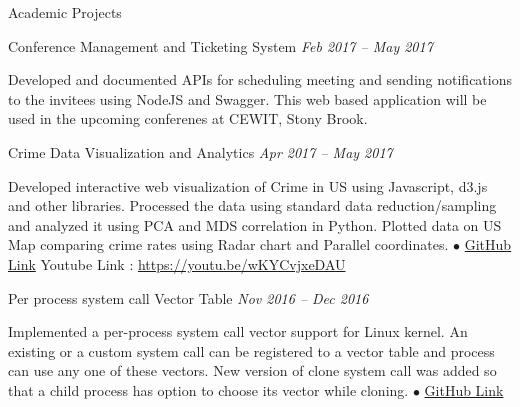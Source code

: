 \documentclass{resume} %
\begin{document}
\begin{rSection}{Academic Projects}


\begin{rSubsection}{Conference Management and Ticketing System} {\emph {Feb 2017 -- May 2017}}{}{}
	\item Developed and documented APIs for scheduling meeting and sending notifications to the invitees using NodeJS and Swagger. This web based application will be used in the upcoming conferenes at CEWIT, Stony Brook.
\end{rSubsection}



\begin{rSubsection}{Crime Data Visualization and Analytics} {\emph {Apr 2017 -- May 2017}}{}{}
\item Developed interactive web visualization of Crime in US using Javascript, d3.js and other libraries. Processed the data using standard data reduction/sampling and analyzed it using PCA and MDS correlation in Python. Plotted data on US Map comparing crime rates using Radar chart and Parallel coordinates.
{\tiny$\bullet$}
\href{https://github.com/t-lohani/Crime-data-visualization-and-analytics}{GitHub Link}
Youtube Link : \href{https://youtu.be/wKYCvjxeDAU}{https://youtu.be/wKYCvjxeDAU}
\end{rSubsection}


\begin{rSubsection}{Per process system call Vector Table} {\emph {Nov 2016 -- Dec 2016}}{}{}
\item Implemented a per-process system call vector support for Linux kernel. An existing or a custom system call can be registered to a vector table and process can use any one of these vectors. New version of clone system call was added so that a child process has option to choose its vector while cloning.
{\tiny$\bullet$}
\href{https://github.com/t-lohani/Per-process-system-call}{GitHub Link}
\end{rSubsection}


\end{rSection}
\end{document}
